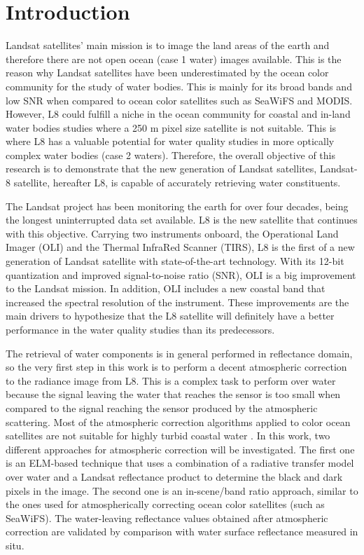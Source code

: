 \chapter{Introduction}
\label{ch:introduction} 
Landsat satellites' main mission is to image the land areas of the earth and therefore there are not open ocean (case 1 water) images available. This is the reason why Landsat satellites have been underestimated by the ocean color community for the study of water bodies. This is mainly for its broad bands and low SNR when compared to ocean color satellites such as SeaWiFS and MODIS. However, L8 could fulfill a niche in the ocean community for coastal and in-land water  bodies studies where a 250 m pixel size satellite is not suitable. This is where L8 has a valuable potential for water quality studies in more optically complex water bodies (case 2 waters). Therefore, the overall objective of this research is to demonstrate that the new generation of Landsat satellites, Landsat-8 satellite, hereafter L8, is capable of accurately retrieving water constituents.

The Landsat project has been monitoring the earth for over four decades, being the longest uninterrupted data set available. L8 is the new satellite that continues with this objective. Carrying two instruments onboard, the Operational Land Imager (OLI) and the Thermal InfraRed Scanner (TIRS), L8 is the first of a new generation of Landsat satellite with state-of-the-art technology. With its 12-bit quantization and improved signal-to-noise ratio (SNR), OLI is a big improvement to the Landsat mission. In addition, OLI includes a new coastal band that increased the spectral resolution of the instrument. These improvements are the main drivers to hypothesize that the L8 satellite will definitely have a better performance in the water quality studies than its predecessors. 

The retrieval of water components is {\color{red} in general performed in reflectance domain}, so the very first step in this work is to perform a {\color{red} decent} atmospheric correction to the radiance image from L8. This is a complex task to perform over water because the signal leaving the water that reaches the sensor is too small when compared to the signal reaching the sensor produced by the atmospheric scattering. Most of the atmospheric correction algorithms applied to color ocean satellites are not suitable for highly turbid coastal water \cite{Patt2003}. In this work, two different approaches for atmospheric correction will be investigated. The first one is an ELM-based technique that uses a combination of a radiative transfer model over water and a Landsat reflectance product to determine the black and dark pixels in the image. The second one is an in-scene/band ratio approach, similar to the ones used for atmospherically correcting ocean color satellites (such as SeaWiFS). The water-leaving reflectance values obtained after atmospheric correction are validated by comparison with water surface reflectance measured in situ. 

